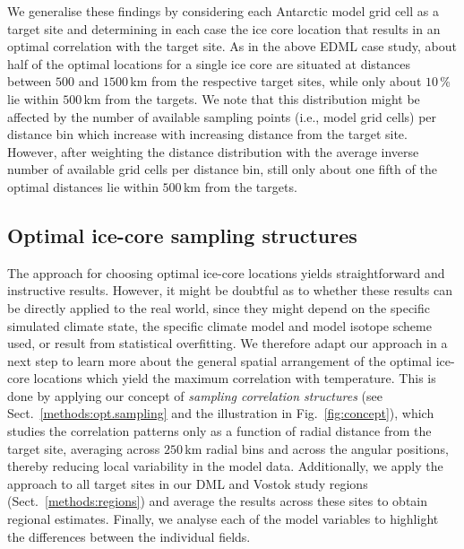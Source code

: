 \documentclass[cp, manuscript]{copernicus}
\begin{document}
We generalise these findings by considering each Antarctic model grid cell as a
target site and determining in each case the ice core location that results in
an optimal correlation with the target site. As in the above EDML case study,
about half of the optimal locations for a single ice core are situated at
distances between $500$ and $1500$\,km from the respective target sites, while
only about $10$\,\% lie within $500$\,km from the targets. We note that this
distribution might be affected by the number of available sampling points (i.e.,
model grid cells) per distance bin which increase with increasing distance from
the target site. However, after weighting the distance distribution with the
average inverse number of available grid cells per distance bin, still only
about one fifth of the optimal distances lie within $500$\,km from the targets.

\subsection{Optimal ice-core sampling structures}
\label{results:optim-spacing}

The approach for choosing optimal ice-core locations yields straightforward and
instructive results. However, it might be doubtful as to whether these results
can be directly applied to the real world, since they might depend on the
specific simulated climate state, the specific climate model and model isotope
scheme used, or result from statistical overfitting. We therefore adapt our
approach in a next step to learn more about the general spatial arrangement of
the optimal ice-core locations which yield the maximum correlation with
temperature. This is done by applying our concept of \emph{sampling correlation
structures} (see Sect.~\ref{methods:opt.sampling} and the illustration in
Fig.~\ref{fig:concept}), which studies the correlation patterns only as a
function of radial distance from the target site, averaging across $250$\,km
radial bins and across the angular positions, thereby reducing local variability
in the model data. Additionally, we apply the approach to all target sites in
our DML and Vostok study regions (Sect.~\ref{methods:regions}) and average the
results across these sites to obtain regional estimates. Finally, we analyse
each of the model variables to highlight the differences between the individual
fields.
\end{document}

